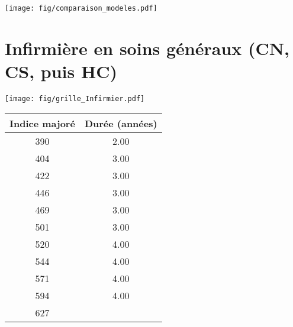 
 \begin{center}\texttt{[image: fig/comparaison\_modeles.pdf]}\end{center} 

\newpage 
 
\chapter{Infirmière en soins généraux (CN, CS, puis HC)} 

\begin{minipage}{0.55\linewidth}\texttt{[image: fig/grille\_Infirmier.pdf]}\end{minipage} 
\begin{minipage}{0.3\linewidth} 
 \begin{center} 

\begin{tabular}[htb]{|c|c|} 
\hline 
 Indice majoré &  Durée (années) \\ 
\hline \hline 
 390 &  2.00 \\ 
\hline 
 404 &  3.00 \\ 
\hline 
 422 &  3.00 \\ 
\hline 
 446 &  3.00 \\ 
\hline 
 469 &  3.00 \\ 
\hline 
 501 &  3.00 \\ 
\hline 
 520 &  4.00 \\ 
\hline 
 544 &  4.00 \\ 
\hline 
 571 &  4.00 \\ 
\hline 
 594 &  4.00 \\ 
\hline 
 627 &   \\ 
\hline 
\hline 
\end{tabular} 
\end{center} 
 \end{minipage} 

~\\ 
 


   
 \localtableofcontents 

~\\ 
 
